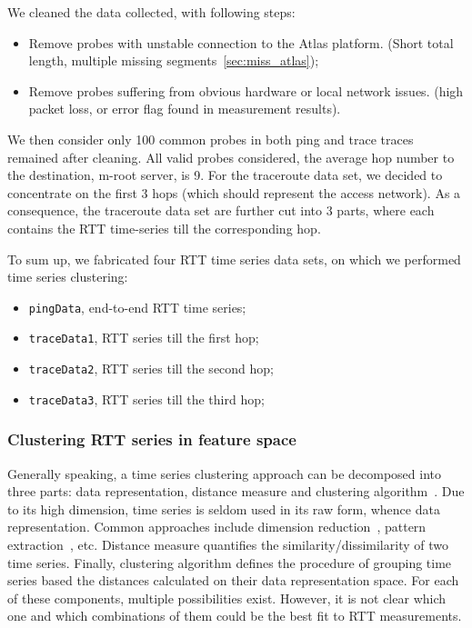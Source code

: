 We cleaned the data collected, with following steps:
\begin{itemize}
\item Remove probes with unstable connection to the Atlas platform. (Short total length, multiple missing segments~\ref{sec:miss_atlas});
\item Remove probes suffering from obvious hardware or local network issues. (high packet loss, or error flag found in measurement results).
\end{itemize}

We then consider only 100 common probes in both ping and trace traces remained after cleaning.
All valid probes considered, the average hop number to the destination, m-root server, is 9. 
For the traceroute data set, we decided to concentrate on the first 3 hops (which should represent the access network). As a consequence, the traceroute data set are further cut into 3 parts, where each contains the RTT time-series till the corresponding hop.

To sum up, we fabricated four RTT time series data sets, on which we performed time series clustering:
\begin{itemize}
\item \texttt{pingData}, end-to-end RTT time series;
\item \texttt{traceData1}, RTT series till the first hop;
\item \texttt{traceData2}, RTT series till the second hop;
\item \texttt{traceData3}, RTT series till the third hop;
\end{itemize}

\subsubsection{Clustering RTT series in feature space}
\label{sec:cls_ft}
Generally speaking, a time series clustering approach can be decomposed into three parts: data representation, distance measure and clustering algorithm~\cite{Aghabozorgi2015}. 
Due to its high dimension, time series is seldom used in its raw form, whence data representation.
Common approaches include dimension reduction~\cite{Elhamifar2013}, pattern extraction~\cite{Ulanova2015}, etc.
Distance measure quantifies the similarity/dissimilarity of two time series. Finally, clustering algorithm defines the procedure of grouping time series based the distances calculated on their data representation space.
For each of these components, multiple possibilities exist. However, it is not clear which one and which combinations of them could be the best fit to RTT measurements. 

